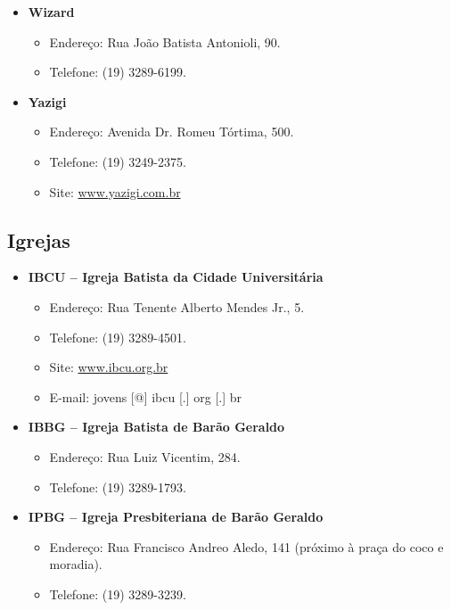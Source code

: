 \begin{itemize}
\item  \textbf{Wizard}
\begin{itemize}
\item  Endereço: Rua João Batista Antonioli, 90.
\item  Telefone: (19) 3289-6199.
\end{itemize}
\end{itemize}

\begin{itemize}
\item  \textbf{Yazigi}
\begin{itemize}
\item  Endereço: Avenida Dr. Romeu Tórtima, 500.
\item  Telefone: (19) 3249-2375.
\item  Site: \url{www.yazigi.com.br}
\end{itemize}
\end{itemize}

\subsection{Igrejas}
\begin{itemize}
\item  \textbf{IBCU -- Igreja Batista da Cidade Universitária}
\begin{itemize}
\item  Endereço: Rua Tenente Alberto Mendes Jr., 5.
\item  Telefone: (19) 3289-4501.
\item  Site: \url{www.ibcu.org.br}
\item  E-mail: jovens [@] ibcu [.] org [.] br
\end{itemize}
\end{itemize}

\begin{itemize}
\item  \textbf{IBBG -- Igreja Batista de Barão Geraldo}
\begin{itemize}
\item  Endereço: Rua Luiz Vicentim, 284.
\item  Telefone: (19) 3289-1793.
\end{itemize}
\end{itemize}

\begin{itemize}
\item  \textbf{IPBG -- Igreja Presbiteriana de Barão Geraldo}
\begin{itemize}
\item  Endereço: Rua Francisco Andreo Aledo, 141 (próximo à praça do coco e moradia).
\item  Telefone: (19) 3289-3239.
\end{itemize}
\end{itemize}

